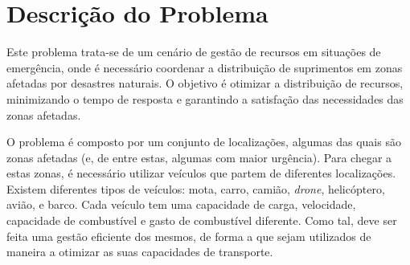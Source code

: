 \documentclass[a4paper,12pt]{scrreprt}
\begin{document}
\renewcommand{\contentsname}{Índice}
\renewcommand{\listfigurename}{Índice de Figuras}
\renewcommand{\listtablename}{Índice de Tabelas}

\tableofcontents
\pagebreak

\listoffigures
\pagebreak

\listoftables
\pagebreak





\chapter{Descrição do Problema}

Este problema trata-se de um cenário de gestão de recursos em situações de emergência, onde é 
necessário coordenar a distribuição de suprimentos em zonas afetadas por desastres naturais.
O objetivo é otimizar a distribuição de recursos, minimizando o tempo de resposta e garantindo a
satisfação das necessidades das zonas afetadas.

O problema é composto por um conjunto de localizações, algumas das quais são zonas afetadas (e, de entre
estas, algumas com maior urgência). Para chegar a estas zonas, é necessário utilizar veículos que partem
de diferentes localizações. Existem diferentes tipos de veículos: mota, carro, camião, \textit{drone}, helicóptero,
avião, e barco. Cada veículo tem uma capacidade de carga, velocidade, capacidade de combustível e gasto de combustível
diferente. Como tal, deve ser feita uma gestão eficiente dos mesmos, de forma a que sejam utilizados de maneira
a otimizar as suas capacidades de transporte.
\end{document}

